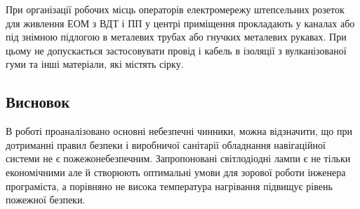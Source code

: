 \documentclass[ukrainian,utf8,simple,floatsubsection, hpadding=5mm,equationsubsection,]{eskdtext}
\begin{document}
При організації робочих місць операторів електромережу штепсельних розеток для живлення ЕОМ з ВДТ і ПП у центрі приміщення прокладають у каналах або під знімною підлогою в металевих трубах або гнучких металевих рукавах. При цьому не допускається застосовувати провід і кабель в ізоляції з вулканізованої гуми та інші матеріали, які містять сірку.


\subsection{Висновок}
В роботі проаналізовано основні небезпечні чинники, можна відзначити, що при дотриманні правил безпеки і виробничої санітарії обладнання навігаційної системи не є пожежонебезпечним. Запропоновані світлодіодні лампи є не тільки економічними але й створюють оптимальні умови для зорової роботи інженера програміста, а порівняно не висока температура нагрівання підвищує рівень пожежної безпеки.
\end{document}
